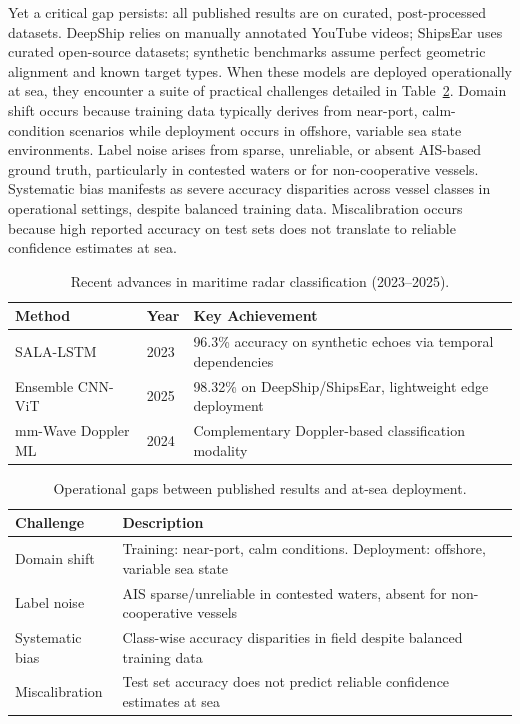 \documentclass[conf]{asmeconf}
\begin{document}
Yet a critical gap persists: all published results are on curated, post-processed datasets. DeepShip relies on manually annotated YouTube videos; ShipsEar uses curated open-source datasets; synthetic benchmarks assume perfect geometric alignment and known target types. When these models are deployed operationally at sea, they encounter a suite of practical challenges detailed in Table~\ref{tab:deployment_gaps}. Domain shift occurs because training data typically derives from near-port, calm-condition scenarios while deployment occurs in offshore, variable sea state environments. Label noise arises from sparse, unreliable, or absent AIS-based ground truth, particularly in contested waters or for non-cooperative vessels. Systematic bias manifests as severe accuracy disparities across vessel classes in operational settings, despite balanced training data. Miscalibration occurs because high reported accuracy on test sets does not translate to reliable confidence estimates at sea.

\begin{table}[t]
\caption{Recent advances in maritime radar classification (2023--2025).}
\label{tab:radar_progress}
\centering
\small
\begin{tabular}{@{}llp{4cm}@{}}
\toprule
Method & Year & Key Achievement \\
\midrule
SALA-LSTM & 2023 & 96.3\% accuracy on synthetic echoes via temporal dependencies \\
\midrule
Ensemble CNN-ViT & 2025 & 98.32\% on DeepShip/ShipsEar, lightweight edge deployment \\
\midrule
mm-Wave Doppler ML & 2024 & Complementary Doppler-based classification modality \\
\bottomrule
\end{tabular}
\end{table}

\begin{table}[t]
\caption{Operational gaps between published results and at-sea deployment.}
\label{tab:deployment_gaps}
\centering
\small
\begin{tabular}{@{}lp{5cm}@{}}
\toprule
Challenge & Description \\
\midrule
Domain shift & Training: near-port, calm conditions. Deployment: offshore, variable sea state \\
\midrule
Label noise & AIS sparse/unreliable in contested waters, absent for non-cooperative vessels \\
\midrule
Systematic bias & Class-wise accuracy disparities in field despite balanced training data \\
\midrule
Miscalibration & Test set accuracy does not predict reliable confidence estimates at sea \\
\bottomrule
\end{tabular}
\end{table}
\end{document}
